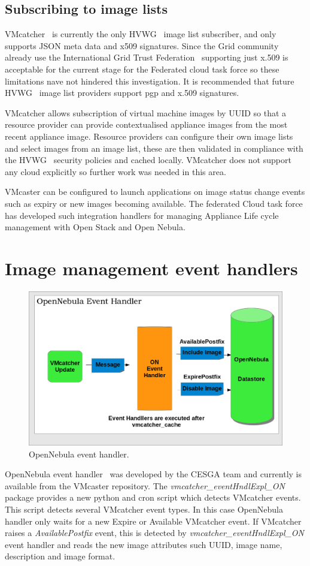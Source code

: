 \documentclass[oribibl]{llncs}
\begin{document}
\subsection{Subscribing to image lists}
VMcatcher~\cite{vmcatcher} is currently the only HVWG~\cite{hepix} image list subscriber, and only supports JSON meta data and x509 signatures. Since the Grid community already use the International Grid Trust Federation~\cite{igtf} supporting just x.509 is acceptable for the current stage for the Federated cloud task force so these limitations nave not hindered this investigation. It is recommended that future HVWG~\cite{hepix} image list providers support pgp and x.509 signatures.

VMcatcher allows subscription of virtual machine images by UUID so that a resource provider can provide contextualised appliance images from the most recent appliance image. Resource providers can configure their own image lists and select images from an image list, these are then validated in compliance with the HVWG~\cite{hepix} security policies and cached locally. VMcatcher does not support any cloud explicitly so further work was needed in this area.

VMcaster can be configured to launch applications on image status change events such as expiry or new images becoming available. The federated Cloud task force has developed such integration handlers for managing Appliance Life cycle management with Open Stack and Open Nebula.
\section{Image management event handlers}
\label{sect-handlers}
\begin{figure}[h]
\centering
\includegraphics[width=1\textwidth]{ONeventhandler.png}
\caption{OpenNebula event handler.}
\label{fig:onevent}
\end{figure}
OpenNebula event handler~\cite{onevent} was developed by the CESGA team and currently is available from the VMcaster repository. 
The \textit{vmcatcher\_eventHndlExpl\_ON} package provides a new python and cron script which detects VMcatcher events. 
This script detects several VMcatcher event types. In this case OpenNebula handler only waits for a new Expire or Available VMcatcher event.
If VMcatcher raises a \textit{AvailablePostfix} event, this is detected by \textit{vmcatcher\_eventHndlExpl\_ON} event handler and reads the new image attributes such UUID, image name, description and image format.
\end{document}
